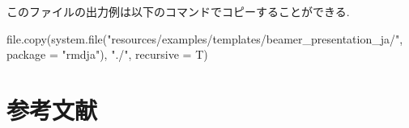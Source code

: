 \documentclass[
  12pt,
  ignorenonframetext,
]{beamer}
\newif\ifbibliography
\newenvironment{Shaded}{\begin{snugshade}}{\end{snugshade}}
\newcommand{\AttributeTok}[1]{\textcolor[rgb]{0.77,0.63,0.00}{#1}}
\newcommand{\FunctionTok}[1]{\textcolor[rgb]{0.00,0.00,0.00}{#1}}
\newcommand{\NormalTok}[1]{#1}
\newcommand{\StringTok}[1]{\textcolor[rgb]{0.31,0.60,0.02}{#1}}
\begin{document}
\begin{frame}[fragile]{}
\protect\hypertarget{section-1}{}
このファイルの出力例は以下のコマンドでコピーすることができる.

\begin{Shaded}
\begin{Highlighting}[]
\FunctionTok{file.copy}\NormalTok{(}\FunctionTok{system.file}\NormalTok{(}\StringTok{"resources/examples/templates/beamer\_presentation\_ja/"}\NormalTok{, }\AttributeTok{package =} \StringTok{"rmdja"}\NormalTok{), }\StringTok{"./"}\NormalTok{, }\AttributeTok{recursive =}\NormalTok{ T)}
\end{Highlighting}
\end{Shaded}
\end{frame}



\section{参考文献}
\begin{frame}[allowframebreaks]
\bibliographytrue
\printbibliography[heading=none]
\end{frame}


\end{document}
